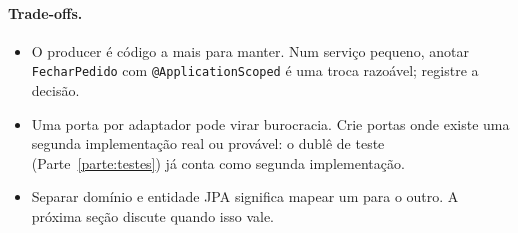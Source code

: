 \paragraph{Trade-offs.}
\begin{itemize}
\item O producer é código a mais para manter. Num serviço pequeno,
  anotar \texttt{FecharPedido} com \texttt{@ApplicationScoped} é uma
  troca razoável; registre a decisão.
\item Uma porta por adaptador pode virar burocracia. Crie portas onde
  existe uma segunda implementação real ou provável: o dublê de teste
  (Parte~\ref{parte:testes}) já conta como segunda implementação.
\item Separar domínio e entidade JPA significa mapear um para o outro.
  A próxima seção discute quando isso vale.
\end{itemize}
